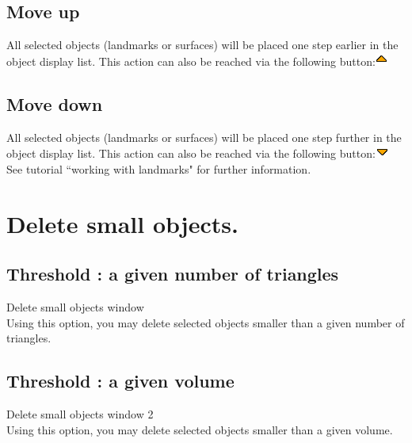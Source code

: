 \subsection{Move up}
All selected objects (landmarks or surfaces) will be placed one step earlier in the object display list.
This action can also be reached via the following button:\includegraphics[scale=0.7]{images/pixmap/s_dessous_17.png}

\subsection{Move down}
All selected objects (landmarks or surfaces) will be placed one step further in the object display list.
This action can also be reached via the following button:\includegraphics[scale=0.7]{images/pixmap/s_dessus_17.png}
See tutorial ``working with landmarks" for further information.

\section{Delete small objects.}
\subsection{Threshold : a given number of triangles}
Delete small objects window\\

Using this option, you may delete selected objects smaller than a given number of triangles.

\subsection{Threshold : a given volume}
Delete small objects window 2\\
Using this option, you may delete selected objects smaller than
a given volume.
